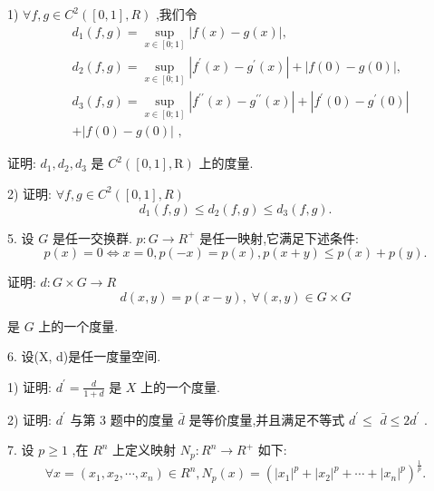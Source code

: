 1) $\forall f,g \in  {C}^{2}\left( {\left\lbrack  {0,1}\right\rbrack  ,R}\right)$ ,我们令
\begin{align*}
	&{d}_{1}\left( {f,g}\right)  = \mathop{\sup }\limits_{{x \in  \left\lbrack  {0;1}\right\rbrack  }}\left| {f\left( x\right)  - g\left( x\right) }\right| ,\\
	&{d}_{2}\left( {f,g}\right)  = \mathop{\sup }\limits_{{x \in  \left\lbrack  {0;1}\right\rbrack  }}\left| {{f}^{\prime }\left( x\right)  - {g}^{\prime }\left( x\right) }\right|  + \left| {f\left( 0\right)  - g\left( 0\right) }\right| ,\\
	&{d}_{3}\left( {f,g}\right)  = \mathop{\sup }\limits_{{x \in  \left\lbrack  {0;1}\right\rbrack  }}\left| {{f}^{\prime \prime }\left( x\right)  - {g}^{\prime \prime }\left( x\right) }\right|  + \left| {{f}^{\prime }\left( 0\right)  - {g}^{\prime }\left( 0\right) }\right|\\
	&+ \left| {f\left( 0\right)  - g\left( 0\right) }\right| \text{ , }
\end{align*}

证明: ${d}_{1},{d}_{2},{d}_{3}$ 是 ${C}^{2}(\left\lbrack  {0,1}\right\rbrack  ,\mathrm{R})$ 上的度量.

2) 证明: $\forall f,g \in  {C}^{2}\left( {\left\lbrack  {0,1}\right\rbrack  ,R}\right)$
$${d}_{1}\left( {f,g}\right)  \leq  {d}_{2}\left( {f,g}\right)  \leq  {d}_{3}\left( {f,g}\right) .$$

5. 设 $G$ 是任一交换群. $p : G \rightarrow  {R}^{ + }$ 是任一映射,它满足下述条件:
$$p\left( x\right)  = 0 \Leftrightarrow  x = 0,p\left( {-x}\right)  = p\left( x\right) ,p\left( {x + y}\right)  \leq  p\left( x\right)  + p\left( y\right) .$$

证明: $d : G \times  G \rightarrow  R$
$$d\left( {x,y}\right)  = p\left( {x - y}\right) ,\;\forall \left( {x,y}\right)  \in  G \times  G$$

是 $G$ 上的一个度量.

6. 设(X, d)是任一度量空间.

1) 证明: ${d}^{\prime } = \frac{d}{1 + d}$ 是 $X$ 上的一个度量.

2) 证明: ${d}^{\prime }$ 与第 3 题中的度量 $\bar{d}$ 是等价度量,并且满足不等式 ${d}^{\prime } \leq$  $\bar{d} \leq  2{d}^{\prime }$ .

7. 设 $p \geq  1$ ,在 ${R}^{n}$ 上定义映射 ${N}_{p} : {R}^{n} \rightarrow  {R}^{ + }$ 如下:
$$\forall x = \left( {{x}_{1},{x}_{2},\cdots ,{x}_{n}}\right)  \in  {R}^{n},{N}_{p}\left( x\right)  = {\left( {\left| {x}_{1}\right| }^{p} + {\left| {x}_{2}\right| }^{p} + \cdots  + {\left| {x}_{n}\right| }^{p}\right) }^{\frac{1}{p}}.$$

